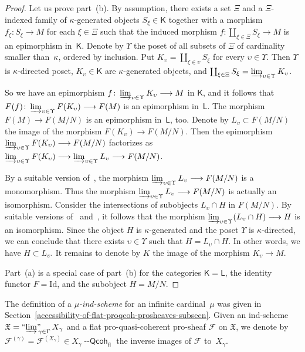 \documentclass[12pt,a4paper]{amsart}
\newcommand{\+}{\protect\nobreakdash-}
\renewcommand{\:}{\colon}
\newcommand{\rarrow}{\longrightarrow}
\newcommand{\Qcoh}{{\operatorname{\mathsf{--Qcoh}}}}
\newcommand{\fl}{\mathsf{fl}}
\newcommand{\ilim}
 {\mathop{\text{\normalfont``$\varinjlim$''\!\!}}\nolimits}
\newcommand{\sK}{\mathsf K}
\newcommand{\sL}{\mathsf L}
\newcommand{\fX}{\mathfrak X}
\newcommand{\rF}{\mathscr F}
\theoremstyle{plain}
\theoremstyle{definition}
\begin{document}
\begin{proof}
 Let us prove part~(b).
 By assumption, there exists a set $\Xi$ and a $\Xi$\+indexed family
of $\kappa$\+generated objects $S_\xi\in\sK$ together with
a morphism $f_\xi\:S_\xi\rarrow M$ for each $\xi\in\Xi$ such that
the induced morphism $f\:\coprod_{\xi\in\Xi}S_\xi\rarrow M$ is
an epimorphism in~$\sK$.
 Denote by $\Upsilon$ the poset of all subsets of $\Xi$ of
cardinality smaller than~$\kappa$, ordered by inclusion.
 Put $K_\upsilon=\coprod_{\xi\in\upsilon}S_\xi$ for every
$\upsilon\in\Upsilon$.
 Then $\Upsilon$ is $\kappa$\+directed poset, $K_\upsilon\in\sK$
are $\kappa$\+generated objects, and $\coprod_{\xi\in\Xi}S_\xi=
\varinjlim_{\upsilon\in\Upsilon}K_\upsilon$.

 So we have an epimorphism $f\:\varinjlim_{\upsilon\in\Upsilon}
K_\upsilon\rarrow M$ in $\sK$, and it follows that
$F(f)\:\varinjlim_{\upsilon\in\Upsilon}F(K_\upsilon)\rarrow F(M)$
is an epimorphism in~$\sL$.
 The morphism $F(M)\rarrow F(M/N)$ is an epimorphism in~$\sL$, too.
 Denote by $L_\upsilon\subset F(M/N)$ the image of the morphism
$F(K_\upsilon)\rarrow F(M/N)$.
 Then the epimorphism $\varinjlim_{\upsilon\in\Upsilon}F(K_\upsilon)
\rarrow F(M/N)$ factorizes as $\varinjlim_{\upsilon\in\Upsilon}
F(K_\upsilon)\rarrow\varinjlim_{\upsilon\in\Upsilon}L_\upsilon
\rarrow F(M/N)$.  {\par}

 By a suitable version of~\cite[Proposition~9.5]{PS6}, the morphism
$\varinjlim_{\upsilon\in\Upsilon}L_\upsilon \rarrow F(M/N)$ is
a monomorphism.
 Thus the morphism $\varinjlim_{\upsilon\in\Upsilon}L_\upsilon
\rarrow F(M/N)$ is actually an isomorphism.
 Consider the intersections of subobjects $L_\upsilon\cap H$
in $F(M/N)$.
 By suitable versions of~\cite[Proposition~9.5]{PS6}
and~\cite[Proposition~III.1.2]{Mit}, it follows that the morphism
$\varinjlim_{\upsilon\in\Upsilon}(L_\upsilon\cap H)\rarrow H$
is an isomorphism.
 Since the object $H$ is $\kappa$\+generated and the poset
$\Upsilon$ is $\kappa$\+directed, we can conclude that there exists
$\upsilon\in\Upsilon$ such that $H=L_\upsilon\cap H$.
 In other words, we have $H\subset L_\upsilon$.
 It remains to denote by $K$ the image of the morphism $K_\upsilon
\rarrow M$.

 Part~(a) is a special case of part~(b) for the categories $\sK=\sL$,
the identity functor $F=\mathrm{Id}$, and the subobject $H=M/N$.
\end{proof}

 The definition of a \emph{$\mu$\+ind-scheme} for an infinite
cardinal~$\mu$ was given in
Section~\ref{accessibility-of-flat-proqcoh-prosheaves-subsecn}.
 Given an ind-scheme $\fX=\ilim_{\gamma\in\Gamma}X_\gamma$
and a flat pro-quasi-coherent pro-sheaf $\rF$ on $\fX$, we denote
by $\rF^{(\gamma)}=\rF^{(X_\gamma)}\in X_\gamma\Qcoh_\fl$ the inverse
images of $\rF$ to~$X_\gamma$.
\end{document}
